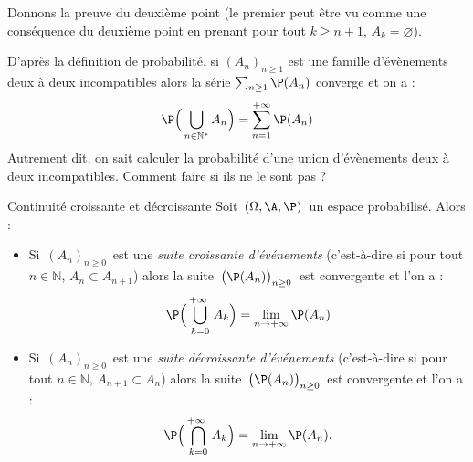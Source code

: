 \documentclass[a4paper,10pt]{report}
\begin{document}
\begin{itemize}
\begin{Demonstration}{} Donnons la preuve du deuxième point (le premier peut être vu comme une conséquence du deuxième point en prenant pour tout $k \geq n+1$, $A_{k}= \varnothing$). 

\vspace{5cm}
%
\end{Demonstration}

\vspace{0.3cm}

D'après la définition de probabilité, si $(A_n)_{n \geq 1}$ est une famille d'évènements deux à deux incompatibles alors la série $\sum_{n \geq 1} \P(A_n)$ converge et on a : 
\[ \P\Big(\bigcup\limits_{n\in \mathbb N^*} A_n\Big) = \sum_{n=1}^{+ \infty} \P (A_n) \]
Autrement dit, on sait calculer la probabilité d'une union d'évènements deux à deux incompatibles. Comment faire si ils ne le sont pas ?

%

\begin{Theoreme}{Continuité croissante et décroissante}
Soit $\,(\Omega , \A , \P)\,$ un espace probabilisé. Alors :

\vspace{0.2cm}

\begin{itemize}
\item Si $\,(A_n)_{n \geq 0}\,$ est une \emph{suite croissante d'événements} 
(c'est-à-dire si pour tout $n \in \mathbb{N}$, $A_n\subset A_{n+1}$) alors la suite $\,\big(\P(A_n)\big)_{n \geq 0}\,$ est convergente et l'on a :
$$\P\Big(\bigcup_{k=0}^{+\infty\ }A_k\Big) =\lim_{n\to+\infty}\P(A_n)$$
\item  Si $\,(A_n)_{n \geq 0}\,$ est une \emph{suite décroissante d'événements}
(c'est-à-dire si pour tout $n \in \mathbb{N}$,  $A_{n+1}\subset A_n$) alors la suite $\,\big(\P(A_n)\big)_{n \geq 0}\,$ est convergente et l'on a :
$$\P\Big(\bigcap_{k=0}^{+\infty\ }A_k\Big) = \lim\limits_{n\to+\infty}\P(A_n).$$
\end{itemize}
\end{Theoreme}


\end{itemize}
\end{document}
